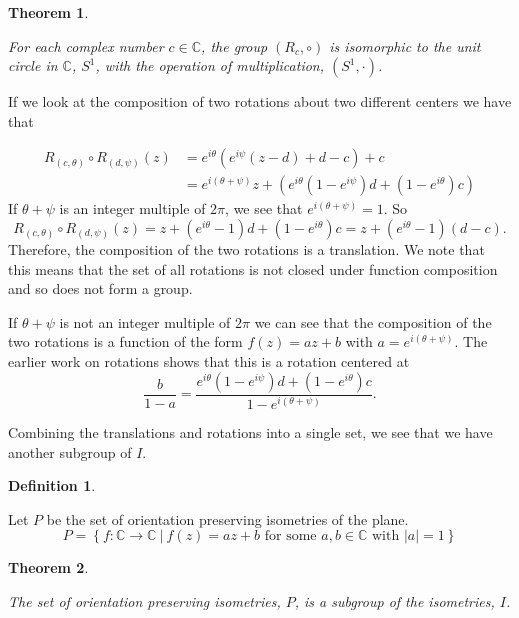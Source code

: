 \documentclass[
]{book}
\newtheorem{theorem}{Theorem}[chapter]
\theoremstyle{definition}
\newtheorem{definition}{Definition}[chapter]
\theoremstyle{definition}
\theoremstyle{definition}
\theoremstyle{definition}
\theoremstyle{remark}
\begin{document}
\begin{theorem}
\protect\hypertarget{thm:unlabeled-div-271}{}\label{thm:unlabeled-div-271}

For each complex number \(c\in \mathbb{C}\), the group \((R_c,\circ)\) is isomorphic to the unit circle in \(\mathbb{C}\), \(S^1\), with the operation of multiplication, \((S^1,\cdot)\).

\end{theorem}

If we look at the composition of two rotations about two different centers we have that

\begin{align*}
    R_{(c,\theta)} \circ R_{(d,\psi)}(z) & = e^{i\theta} \left( e^{i\psi}(z-d)+d-c\right) +c \\
    & = e^{i(\theta + \psi)} z + \left( e^{i\theta} \left(1-e^{i\psi}\right) d + (1-e^{i\theta}) c\right)
\end{align*}
If \(\theta+\psi\) is an integer multiple of \(2\pi\), we see that \(e^{i(\theta+\psi)}=1\). So
\[R_{(c,\theta)} \circ R_{(d,\psi)}(z) = z + (e^{i\theta}-1) d + (1-e^{i\theta}) c = z+ (e^{i\theta}-1)(d-c).\] Therefore, the composition of the two rotations is a translation. We note that this means that the set of all rotations is not closed under function composition and so does not form a group.

If \(\theta+\psi\) is not an integer multiple of \(2\pi\) we can see that the composition of the two rotations is a function of the form \(f(z)=az+b\) with \(a=e^{i(\theta+\psi)}\). The earlier work on rotations shows that this is a rotation centered at \[\frac{b}{1-a} = \frac{e^{i\theta} \left(1-e^{i\psi}\right) d + (1-e^{i\theta}) c}{1-e^{i(\theta+\psi)}}.\]

Combining the translations and rotations into a single set, we see that we have another subgroup of \(I\).

\begin{definition}
\protect\hypertarget{def:unlabeled-div-272}{}\label{def:unlabeled-div-272}

Let \(P\) be the set of orientation preserving isometries of the plane. \[P = \left\{ f: \mathbb{C} \rightarrow \mathbb{C} \: \vert \:  f(z)=a z+b  \mbox{ for some } a, b \in \mathbb{C} \mbox{ with } |a|=1 \right\}\]

\end{definition}

\begin{theorem}
\protect\hypertarget{thm:unlabeled-div-273}{}\label{thm:unlabeled-div-273}

The set of orientation preserving isometries, \(P\), is a subgroup of the isometries, \(I\).

\end{theorem}
\end{document}
